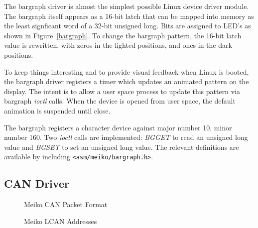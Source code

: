 \documentclass{article}
\begin{document}
  The bargraph driver is almost the simplest possible Linux device driver
module.  The bargraph itself appears as a 16-bit latch that can be mapped
into memory as the least signficant word of a 32-bit unsigned long.
Bits are assigned to LED's as shown in Figure~\ref{bargraph}.  To change
the bargraph pattern, the 16-bit latch value is rewritten, with zeros
in the lighted positions, and ones in the dark positions.

  To keep things interesting and to provide visual feedback when Linux
is booted, the bargraph driver registers a timer which updates an animated
pattern on the display.  The intent is to allow a user space process to
update this pattern via bargraph {\em ioctl} calls.  When the device is 
opened from user space, the default animation is suspended until close.

  The bargraph registers a character device against major number 10,
minor number 160.  Two {\em ioctl} calls are implemented:  {\em BGGET}
to read an unsigned long value and {\em BGSET} to set an unsigned long
value.  The relevant definitions are available by including
{\tt <asm/meiko/bargraph.h>}.

\subsection{CAN Driver}

\begin{figure}
\begin{center}
\caption{Meiko CAN Packet Format}
\label{canpkt}
\end{center}
\end{figure}

\begin{figure}
\begin{center}
\caption{Meiko LCAN Addresses}
\label{canaddr}
\end{center}
\end{figure}

\end{document}

